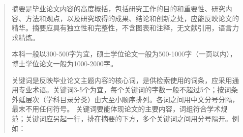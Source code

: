 \begin{abstract}

摘要是毕业论文内容的高度概括，包括研究工作的目的和重要性、研究内容、方法和观点，以及研究取得的成果、结论和创新之处，应能反映论文的精华。摘要应具有独立性和完整性，不含图表和注释，无文献引用，语言力求精炼。

本科一般以300-500字为宜，硕士学位论文一般为500-1000字（一页以内），博士学位论文一般为1000-2000字。

关键词是反映毕业论文主题内容的核心词，是供检索使用的词条，应采用通用专业术语。关键词3-5个为宜，每个关键词的字数一般不超过5个；按词条外延层次（学科目录分类）由大至小顺序排列。各词之间用中文分号分隔，最末不用任何符号。 关键词要能体现论文的主要内容，词组符合学术规范；关键词应另起一行，排在摘要的下方，多个关键词之间用分号隔开。例如：


\end{abstract}